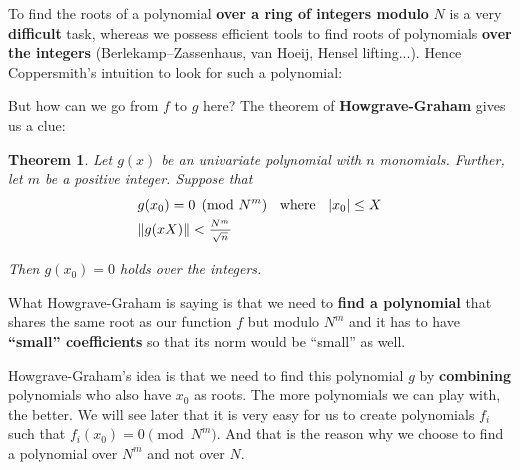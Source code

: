 \documentclass[a4paper,11pt]{article}
\newtheorem{theorem}{Theorem}
\begin{document}
To find the roots of a polynomial \textbf{over a ring of integers modulo} $N$ is a very \textbf{difficult} task, whereas we possess efficient tools to find roots of  polynomials \textbf{over the integers} (Berlekamp–Zassenhaus, van Hoeij, Hensel lifting...). Hence Coppersmith's intuition to look for such a polynomial:



But how can we go from $f$ to $g$ here? The theorem of \textbf{Howgrave-Graham} gives us a clue:

\begin{theorem}
Let $g(x)$ be an univariate polynomial with $n$ monomials. Further, let $m$ be a positive integer. Suppose that
\setcounter{equation}{0}
\begin{align}
&g(x_0) = 0 \pmod{N^m} \hspace{2mm} \text{ where } \hspace{2mm} |x_0| \leq X\\
&\|g(xX)\| < \frac{_{N^m}}{^{\sqrt{n}}}
\end{align}

Then $g(x_0)=0$ holds over the integers.
\end{theorem}

What Howgrave-Graham is saying is that we need to \textbf{find a polynomial} that shares the same root as our function $f$ but modulo $N^m$ and it has to have \textbf{``small'' coefficients} so that its norm would be ``small'' as well.\\


Howgrave-Graham's idea is that we need to find this polynomial $g$ by \textbf{combining} polynomials who also have $x_0$ as roots. The more polynomials we can play with, the better. We will see later that it is very easy for us to create polynomials $f_i$ such that $f_i(x_0) = 0 \pmod{N^m}$. And that is the reason why we choose to find a polynomial over $N^m$ and not over $N$.\\
\end{document}
